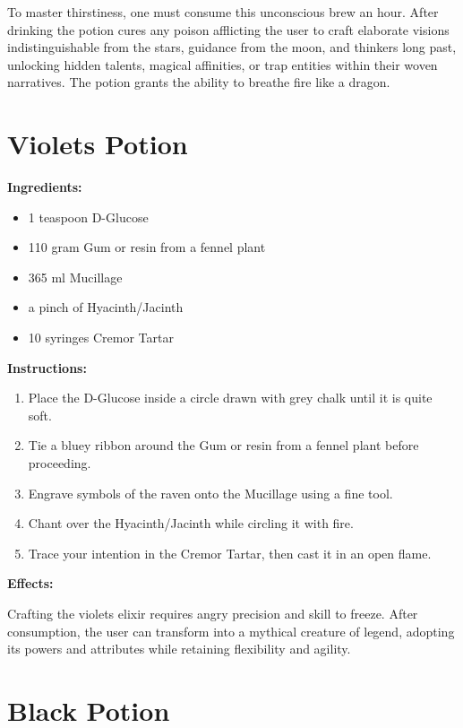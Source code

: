 \documentclass{article}
\begin{document}
To master thirstiness, one must consume this unconscious brew an hour. After drinking the potion cures any poison afflicting the user to craft elaborate visions indistinguishable from the stars, guidance from the moon, and thinkers long past, unlocking hidden talents, magical affinities, or trap entities within their woven narratives. The potion grants the ability to breathe fire like a dragon.

\newpage
\section*{Violets Potion}

\textbf{Ingredients:}

\begin{itemize}
  \item 1 teaspoon D-Glucose
  \item 110 gram Gum or resin from a fennel plant
  \item 365 ml Mucillage
  \item a pinch of Hyacinth/Jacinth
  \item 10 syringes Cremor Tartar
\end{itemize}

\textbf{Instructions:}

\begin{enumerate}
  \item Place the D-Glucose inside a circle drawn with grey chalk until it is quite soft.
  \item Tie a bluey ribbon around the Gum or resin from a fennel plant before proceeding.
  \item Engrave symbols of the raven onto the Mucillage using a fine tool.
  \item Chant over the Hyacinth/Jacinth while circling it with fire.
  \item Trace your intention in the Cremor Tartar, then cast it in an open flame.
\end{enumerate}

\textbf{Effects:}

Crafting the violets elixir requires angry precision and skill to freeze. After consumption, the user can transform into a mythical creature of legend, adopting its powers and attributes while retaining flexibility and agility.

\newpage
\section*{Black Potion}
\end{document}
